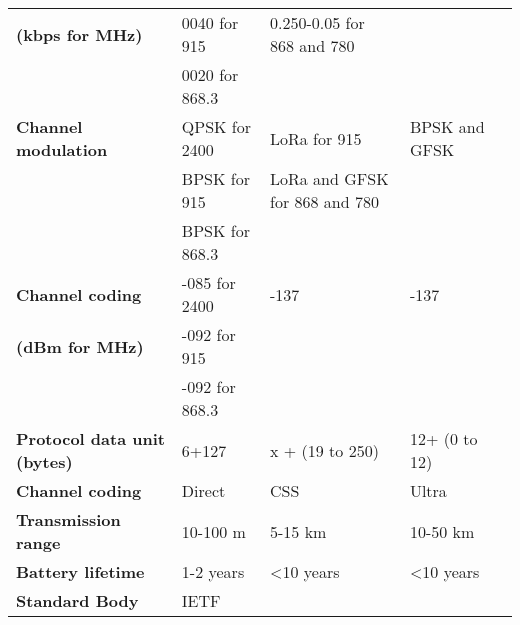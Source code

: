 \begin{table}[h!]
\begin{tabulary}{\textwidth}{L|L|L|L|L}
	\bf{\footnotesize{(kbps for MHz)}}             & 0040 for 915              & 0.250-0.05     for 868 and 780  &                                       &               \\
	\                                              & 0020 for 868.3            &                                 &                                       &               \\\hline
	\bf{Channel modulation}                        & QPSK for 2400             & LoRa           for 915          & BPSK and GFSK                         &               \\
	\                                              & BPSK for 915              & LoRa and GFSK  for 868  and 780 &                                       &               \\
	\                                              & BPSK for 868.3            &                                 &                                       &               \\\hline
	\bf{Channel coding}                            & -085 for 2400             & -137                            & -137                                  &               \\
	\bf{\footnotesize{(dBm for MHz)}}              & -092 for 915              &                                 &                                       &               \\
	\                                              & -092 for 868.3            &                                 &                                       &               \\\hline
	\bf{Protocol data unit \footnotesize{(bytes)}} & 6+127                     & x + (19 to 250)                 & 12+ (0 to 12)                         &               \\\hline
	\bf{Channel coding}                            & Direct                    & CSS                             & Ultra                                 &               \\\hline
	\bf{Transmission range}                        & 10-100 m                  & 5-15 km                         & 10-50 km                              &               \\\hline
	\bf{Battery lifetime}                          & 1-2 years                 & <10 years                       & <10 years                             &               \\\hline
	\bf{Standard Body}                             & IETF                      &                                 &                                       &               \\\hline

\end{tabulary}
\end{table}
